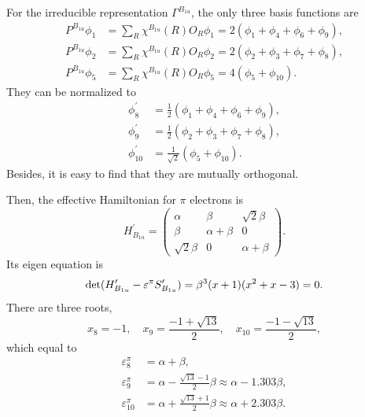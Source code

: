 		For the irreducible representation $\Gamma^{B_{1u}}$, the only three basis functions are
		\begin{align*}
			P^{B_{1u}}\phi_1 &= \sum_{R} \chi^{B_{1u}}(R) O_R \phi_1 = 2(\phi_1 + \phi_4 + \phi_6 + \phi_9 ), \\
			P^{B_{1u}}\phi_2 &= \sum_{R} \chi^{B_{1u}}(R) O_R \phi_2 = 2(\phi_2 + \phi_3 + \phi_7 + \phi_8 ),  \\
			P^{B_{1u}}\phi_5 &= \sum_{R} \chi^{B_{1u}}(R) O_R \phi_5 = 4(\phi_5 + \phi_{10} ).
		\end{align*}
		They can be normalized to
		\begin{align*}
			\phi^\prime_8 &= \frac{1}{2}(\phi_1 + \phi_4 + \phi_6 + \phi_9), \\
			\phi^\prime_9 &= \frac{1}{2}(\phi_2 + \phi_3 + \phi_7 + \phi_8), \\
			\phi^\prime_{10} &= \frac{1}{\sqrt{2}}(\phi_5 +\phi_{10}).
		\end{align*}
		Besides, it is easy to find that they are mutually orthogonal.
		
		Then, the effective Hamiltonian for $\pi$ electrons is
		\begin{equation*}
			H^\prime_{B_{1u}} = \begin{pmatrix}
				\alpha	&	\beta	&	\sqrt{2}\beta	\\
				\beta	&	\alpha+\beta	&	0		\\
				\sqrt{2}\beta	&	0	&\alpha+\beta
				\end{pmatrix}.				
		\end{equation*}
		Its eigen equation is		
		\begin{equation*}
			\det(H^\prime_{B_{1u}}-\varepsilon^\pi S^\prime_{B_{1u}}) = \beta^3 (x+1)( x^2 + x - 3 ) = 0.
		\end{equation*}
		There are three roots,
		\begin{equation*}
			x_8 = -1, \quad x_9 = \frac{-1+\sqrt{13}}{2}, \quad x_{10} = \frac{-1-\sqrt{13}}{2},
		\end{equation*}
		which equal to
		\begin{align}
			\varepsilon^\pi_8 &= \alpha + \beta, \\
			\varepsilon^\pi_9 &= \alpha - \frac{\sqrt{13}-1}{2}\beta \approx \alpha - 1.303 \beta, \\
			\varepsilon^\pi_{10} &= \alpha + \frac{\sqrt{13}+1}{2}\beta \approx \alpha + 2.303 \beta.
		\end{align}
		
